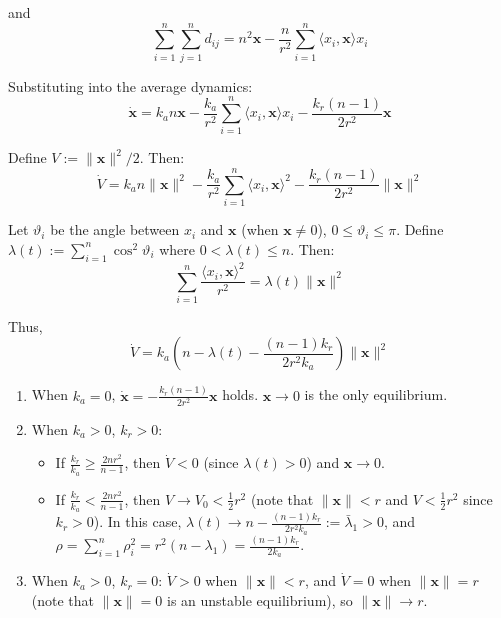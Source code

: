 \documentclass{article}
\begin{document}
and
\begin{equation}
\sum_{i=1}^n \sum_{j=1}^n d_{ij} = n^2 \boldsymbol{x} - \frac{n}{r^2} \sum_{i=1}^n \langle x_i, \boldsymbol{x} \rangle x_i
\end{equation}

Substituting into the average dynamics:
\begin{equation}
\dot{\boldsymbol{x}} = k_a n \boldsymbol{x} - \frac{k_a}{r^2} \sum_{i=1}^n \langle x_i, \boldsymbol{x} \rangle x_i - \frac{k_r(n-1)}{2r^2} \boldsymbol{x}
\end{equation}

Define $V := \|\boldsymbol{x}\|^2 / 2$. Then:
\begin{equation}
\dot{V} = k_a n \|\boldsymbol{x}\|^2 - \frac{k_a}{r^2} \sum_{i=1}^n \langle x_i, \boldsymbol{x} \rangle^2 - \frac{k_r(n-1)}{2r^2} \|\boldsymbol{x}\|^2
\end{equation}

Let $\vartheta_i$ be the angle between $x_i$ and $\boldsymbol{x}$ (when $\boldsymbol{x} \neq 0$), $0 \leq \vartheta_i \leq \pi$. Define $\lambda(t) := \sum_{i=1}^n \cos^2 \vartheta_i$ where $0 < \lambda(t) \leq n$. Then:
\begin{equation}
\sum_{i=1}^n \frac{\langle x_i, \boldsymbol{x} \rangle^2}{r^2} = \lambda(t) \|\boldsymbol{x}\|^2
\end{equation}

Thus,
\begin{equation}
\dot{V} = k_a \left(n - \lambda(t) - \frac{(n-1)k_r}{2r^2 k_a}\right) \|\boldsymbol{x}\|^2
\end{equation}

\begin{enumerate}
\item When $k_a = 0$, $\dot{\boldsymbol{x}} = -\frac{k_r(n-1)}{2r^2} \boldsymbol{x}$ holds. $\boldsymbol{x} \to 0$ is the only equilibrium.

\item When $k_a > 0$, $k_r > 0$:
\begin{itemize}
\item If $\frac{k_r}{k_a} \geq \frac{2nr^2}{n-1}$, then $\dot{V} < 0$ (since $\lambda(t) > 0$) and $\boldsymbol{x} \to 0$.
\item If $\frac{k_r}{k_a} < \frac{2nr^2}{n-1}$, then $V \to V_0 < \frac{1}{2}r^2$ (note that $\|\boldsymbol{x}\| < r$ and $V < \frac{1}{2}r^2$ since $k_r > 0$). In this case, $\lambda(t) \to n - \frac{(n-1)k_r}{2r^2 k_a} := \bar{\lambda}_1 > 0$, and $\rho = \sum_{i=1}^n \rho_i^2 = r^2(n - \lambda_1) = \frac{(n-1)k_r}{2k_a}$.
\end{itemize}

\item When $k_a > 0$, $k_r = 0$: $\dot{V} > 0$ when $\|\boldsymbol{x}\| < r$, and $\dot{V} = 0$ when $\|\boldsymbol{x}\| = r$ (note that $\|\boldsymbol{x}\| = 0$ is an unstable equilibrium), so $\|\boldsymbol{x}\| \to r$.
\end{enumerate}
\end{document}

